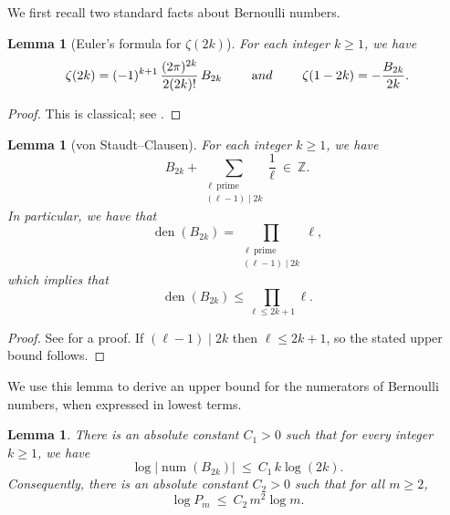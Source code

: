 \documentclass[12pt]{amsart}
\theoremstyle{plain}
\newtheorem{lemma}[theorem]{Lemma}
\theoremstyle{definition}
\newcommand{\ZZ}{\mathbb{Z}}
\DeclareMathOperator{\num}{num}
\DeclareMathOperator{\den}{den}
\begin{document}
We first recall two standard facts about Bernoulli numbers.

\begin{lemma}[Euler's formula for $\zeta(2k)$]\label{lem:euler-zeta}
For each integer $k\ge 1$, we have
\[
\zeta(2k)=(-1)^{k+1}\,\frac{(2\pi)^{2k}}{2(2k)!}\,B_{2k} \ \qquad {\text and}\ \qquad
\zeta(1-2k)=-\frac{B_{2k}}{2k}.
\]
\end{lemma}

\begin{proof}
This is classical; see \cite[Ch.~12, Thm.~12.17]{Apostol1976}.
\end{proof}

\begin{lemma}[von Staudt--Clausen]\label{lem:vsc}
For each integer $k\ge 1$, we have
\[
B_{2k}+\sum_{\substack{\ell\ \mathrm{prime}\\ (\ell-1)\mid 2k}}\frac{1}{\ell}\ \in\ \ZZ.
\]
In particular, we have that
\[
\den(B_{2k})=\prod_{\substack{\ell\ \mathrm{prime}\\ (\ell-1)\mid 2k}}\ell, \label{eqn:lean-mess}
\]
which implies that
\begin{equation}
\label{eqn:vsc_consequence}
    \den(B_{2k})\le \prod_{\ell\le 2k+1}\ell.
\end{equation}
\end{lemma}

\begin{proof}
See \cite[Ch.~12, Exercise~12]{Apostol1976} for a proof.
If $(\ell-1)\mid 2k$ then $\ell\le 2k+1$, so the stated upper bound follows.
\end{proof}

We use this lemma to derive an upper bound for the numerators of Bernoulli numbers,
when expressed in lowest terms.


\begin{lemma}\label{lem:num-growth}
There is an absolute constant $C_1>0$ such that for every integer $k\ge 1$, we have
\[
\log\bigl|\num(B_{2k})\bigr|\ \le\ C_1\,k\log(2k).
\]
Consequently, there is an absolute constant $C_2>0$ such that for all $m\ge 2$,
\[
\log P_m\ \le\ C_2\,m^2\log m.
\]
\end{lemma}
\end{document}
